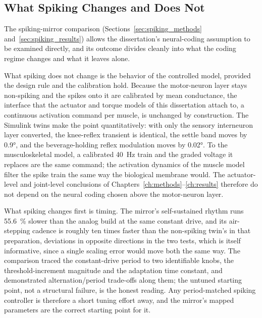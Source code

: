 \subsection{What Spiking Changes and Does Not}\label{sec:disc_spiking}

The spiking-mirror comparison (Sections~\ref{sec:spiking_methods} and~\ref{sec:spiking_results}) allows the dissertation's neural-coding assumption to be examined directly, and its outcome divides cleanly into what the coding regime changes and what it leaves alone.

What spiking does not change is the behavior of the controlled model, provided the design rule and the calibration hold. Because the motor-neuron layer stays non-spiking and the spikes onto it are calibrated by mean conductance, the interface that the actuator and torque models of this dissertation attach to, a continuous activation command per muscle, is unchanged by construction. The Simulink twins make the point quantitatively: with only the sensory interneuron layer converted, the knee-reflex transient is identical, the settle band moves by \ang{0.9}, and the beverage-holding reflex modulation moves by \ang{0.02}. To the musculoskeletal model, a calibrated \qty{40}{\hertz} train and the graded voltage it replaces are the same command; the activation dynamics of the muscle model filter the spike train the same way the biological membrane would. The actuator-level and joint-level conclusions of Chapters~\ref{ch:methods}--\ref{ch:results} therefore do not depend on the neural coding chosen above the motor-neuron layer.

What spiking changes first is timing. The mirror's self-sustained rhythm runs \qty{55.6}{\percent} slower than the analog build at the same constant drive, and its air-stepping cadence is roughly ten times faster than the non-spiking twin's in that preparation, deviations in opposite directions in the two tests, which is itself informative, since a single scaling error would move both the same way. The comparison traced the constant-drive period to two identifiable knobs, the threshold-increment magnitude and the adaptation time constant, and demonstrated alternation/period trade-offs along them; the untuned starting point, not a structural failure, is the honest reading. Any period-matched spiking controller is therefore a short tuning effort away, and the mirror's mapped parameters are the correct starting point for it.

